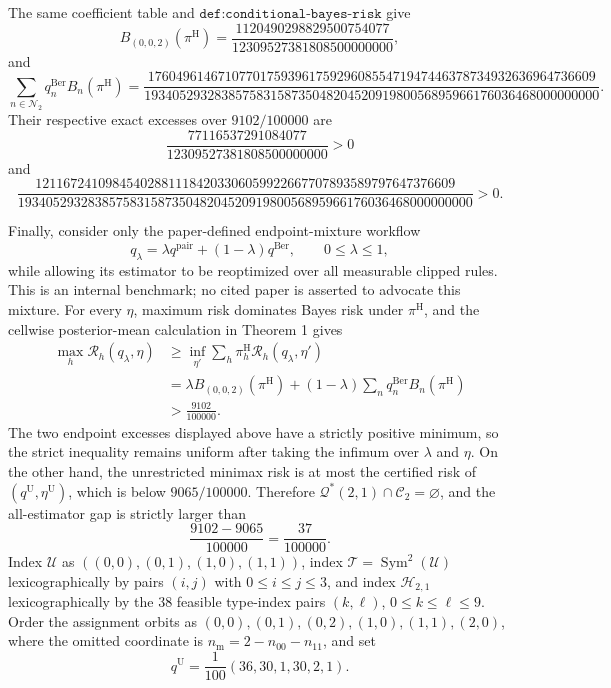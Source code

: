 The same coefficient table and \(\texttt{def:conditional-bayes-risk}\) give
\[
 B_{(0,0,2)}(\pi^{\mathrm H})
 =\frac{1120490298829500754077}{12309527381808500000000},
\]
and
\[
 \sum_{n\in\mathcal N_2}q_n^{\mathrm{Ber}}B_n(\pi^{\mathrm H})
 =\frac{1760496146710770175939617592960855471947446378734932636964736609}
 {19340529328385758315873504820452091980056895966176036468000000000}.
\]
Their respective exact excesses over \(9102/100000\) are
\[
 \frac{77116537291084077}{12309527381808500000000}>0
\]
and
\[
 \frac{121167241098454028811184203306059922667707893589797647376609}
 {19340529328385758315873504820452091980056895966176036468000000000}>0.
\]

Finally, consider only the paper-defined endpoint-mixture workflow
\[
 q_\lambda=\lambda q^{\mathrm{pair}}+(1-\lambda)q^{\mathrm{Ber}},
 \qquad 0\le\lambda\le1,
\]
while allowing its estimator to be reoptimized over all measurable clipped rules. This is an internal benchmark; no cited paper is asserted to advocate this mixture. For every \(\eta\), maximum risk dominates Bayes risk under \(\pi^{\mathrm H}\), and the cellwise posterior-mean calculation in Theorem 1 gives
\[
\begin{aligned}
 \max_h\mathcal R_h(q_\lambda,\eta)
 &\ge \inf_{\eta'}\sum_h\pi_h^{\mathrm H}
 \mathcal R_h(q_\lambda,\eta')\\
 &=\lambda B_{(0,0,2)}(\pi^{\mathrm H})
 +(1-\lambda)\sum_nq_n^{\mathrm{Ber}}B_n(\pi^{\mathrm H})\\
 &>\frac{9102}{100000}.
\end{aligned}
\]
The two endpoint excesses displayed above have a strictly positive minimum, so the strict inequality remains uniform after taking the infimum over \(\lambda\) and \(\eta\). On the other hand, the unrestricted minimax risk is at most the certified risk of \((q^{\mathrm U},\eta^{\mathrm U})\), which is below \(9065/100000\). Therefore \(\mathcal Q^*(2,1)\cap\mathcal C_2=\varnothing\), and the all-estimator gap is strictly larger than
\[
 \frac{9102-9065}{100000}=\frac{37}{100000}.
\]
Index \(\mathcal U\) as \(((0,0),(0,1),(1,0),(1,1))\), index \(\mathcal T=\operatorname{Sym}^2(\mathcal U)\) lexicographically by pairs \((i,j)\) with \(0\le i\le j\le3\), and index \(\mathcal H_{2,1}\) lexicographically by the \(38\) feasible type-index pairs \((k,\ell)\), \(0\le k\le\ell\le9\). Order the assignment orbits as \((0,0),(0,1),(0,2),(1,0),(1,1),(2,0)\), where the omitted coordinate is \(n_{\mathrm m}=2-n_{00}-n_{11}\), and set
\[
 q^{\mathrm U}=\frac1{100}(36,30,1,30,2,1).
\]
